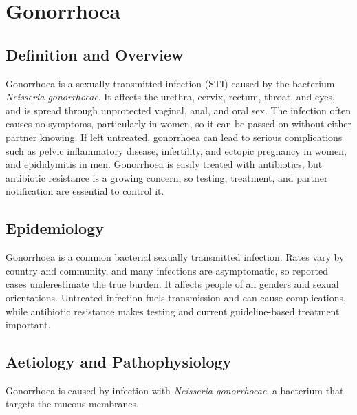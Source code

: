 \chapter{Gonorrhoea}

\section*{Definition and Overview}
Gonorrhoea is a sexually transmitted infection (STI) caused by the bacterium \textit{Neisseria gonorrhoeae}. It affects the urethra, cervix, rectum, throat, and eyes, and is spread through unprotected vaginal, anal, and oral sex. The infection often causes no symptoms, particularly in women, so it can be passed on without either partner knowing. If left untreated, gonorrhoea can lead to serious complications such as pelvic inflammatory disease, infertility, and ectopic pregnancy in women, and epididymitis in men. Gonorrhoea is easily treated with antibiotics, but antibiotic resistance is a growing concern, so testing, treatment, and partner notification are essential to control it.

\section*{Epidemiology}
Gonorrhoea is a common bacterial sexually transmitted infection. Rates vary by country and community, and many infections are asymptomatic, so reported cases underestimate the true burden. It affects people of all genders and sexual orientations. Untreated infection fuels transmission and can cause complications, while antibiotic resistance makes testing and current guideline-based treatment important.

\section*{Aetiology and Pathophysiology}
Gonorrhoea is caused by infection with \textit{Neisseria gonorrhoeae}, a bacterium that targets the mucous membranes.

